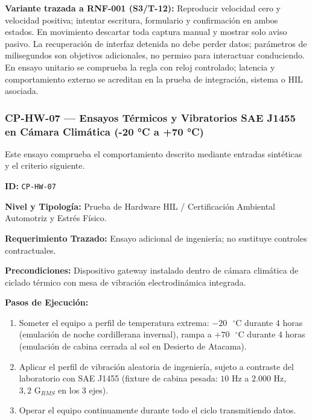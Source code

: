 \par\noindent\textbf{Variante trazada a RNF-001 (S3/T-12):} Reproducir velocidad cero y velocidad positiva; intentar escritura, formulario y confirmación en ambos estados. En movimiento descartar toda captura manual y mostrar solo aviso pasivo. La recuperación de interfaz detenida no debe perder datos; parámetros de milisegundos son objetivos adicionales, no permiso para interactuar conduciendo. En ensayo unitario se comprueba la regla con reloj controlado; latencia y comportamiento externo se acreditan en la prueba de integración, sistema o HIL asociada.\par

\subsubsection*{CP-HW-07 — Ensayos Térmicos y Vibratorios SAE J1455 en Cámara Climática (-20 °C a +70 °C)}\label{sec:9-cp-hw-07}
Este ensayo comprueba el comportamiento descrito mediante entradas sintéticas y el criterio siguiente.

\par\noindent \textbf{ID:} \texttt{CP-\allowbreak{}HW-\allowbreak{}07}\par
\par\noindent \textbf{Nivel y Tipología:} Prueba de Hardware HIL / Certificación Ambiental Automotriz y Estrés Físico.\par
\par\noindent \textbf{Requerimiento Trazado:} Ensayo adicional de ingeniería; no sustituye controles contractuales.\par
\par\noindent \textbf{Precondiciones:} Dispositivo gateway instalado dentro de cámara climática de ciclado térmico con mesa de vibración electrodinámica integrada.\par
\par\noindent \textbf{Pasos de Ejecución:}\par
\begin{enumerate}
\item Someter el equipo a perfil de temperatura extrema: $-20\text{ }^\circ\text{C}$ durante 4 horas (emulación de noche cordillerana invernal), rampa a $+70\text{ }^\circ\text{C}$ durante 4 horas (emulación de cabina cerrada al sol en Desierto de Atacama).
\item Aplicar el perfil de vibración aleatoria de ingeniería, sujeto a contraste del laboratorio con SAE J1455 (fixture de cabina pesada: \(10\text{ Hz}\) a \(2.000\text{ Hz}\), \(3{,}2\text{ G}_{RMS}\) en los 3 ejes).
\item Operar el equipo continuamente durante todo el ciclo transmitiendo datos.
\end{enumerate}

